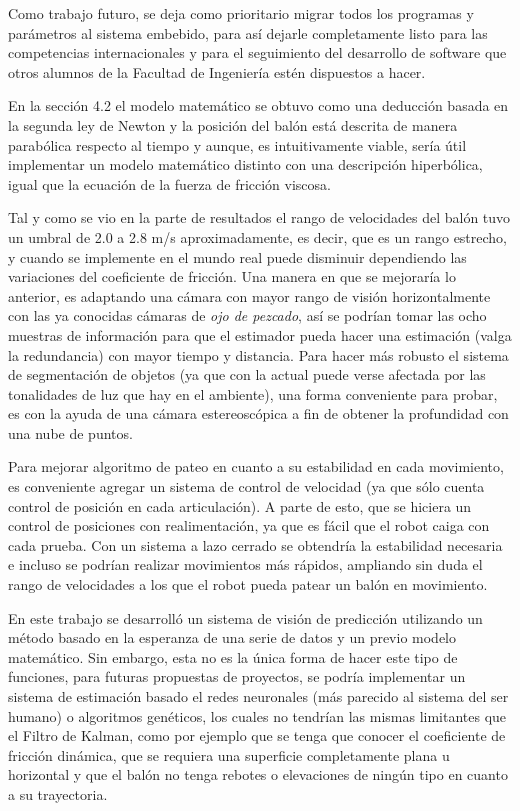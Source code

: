 	Como trabajo futuro, se deja como prioritario migrar todos los programas y parámetros al sistema embebido, para así dejarle completamente listo para las competencias internacionales y para el seguimiento del desarrollo de software que otros alumnos de la Facultad de Ingeniería estén dispuestos a hacer.

	 En la sección 4.2 el modelo matemático se obtuvo como una deducción basada en la segunda ley de Newton y la posición del balón está descrita de manera parabólica respecto al tiempo y aunque, es intuitivamente viable, sería útil implementar un modelo matemático distinto con una descripción hiperbólica, igual que la ecuación de la fuerza de fricción viscosa.
	 
	Tal y como se vio en la parte de resultados el rango de velocidades del balón tuvo un umbral de 2.0 a 2.8 m/s aproximadamente, es decir, que es un rango estrecho, y cuando se implemente en el mundo real puede disminuir dependiendo las variaciones del coeficiente de fricción. Una manera en que se mejoraría lo anterior, es adaptando una cámara con mayor rango de visión horizontalmente con las ya conocidas cámaras de \textit{ojo de pezcado}, así se podrían tomar las ocho muestras de información para que el estimador pueda hacer una estimación (valga la redundancia) con mayor tiempo y distancia. Para hacer más robusto el sistema de segmentación de objetos (ya que con la actual puede verse afectada por las tonalidades de luz que hay en el ambiente), una forma conveniente para probar, es con la ayuda de una cámara estereoscópica a fin de obtener la profundidad con una nube de puntos.

	Para mejorar algoritmo de pateo en cuanto a su estabilidad en cada movimiento, es conveniente agregar un sistema de control de velocidad (ya que sólo cuenta control de posición en cada articulación). A parte de esto, que se hiciera un control de posiciones con realimentación, ya que es fácil que el robot caiga con cada prueba. Con un sistema a lazo cerrado se obtendría la estabilidad necesaria e incluso se podrían realizar movimientos más rápidos, ampliando sin duda el rango de velocidades a los que el robot pueda patear un balón en movimiento. 
		
	En este trabajo se desarrolló un sistema de visión de predicción utilizando un método basado en la esperanza de una serie de datos y un previo modelo matemático. Sin embargo, esta no es la única forma de hacer este tipo de funciones, para futuras propuestas de proyectos, se podría implementar un sistema de estimación basado el redes neuronales (más parecido al sistema del ser humano) o algoritmos genéticos, los cuales no tendrían las mismas limitantes que el Filtro de Kalman, como por ejemplo que se tenga que conocer el coeficiente de fricción dinámica, que se requiera una superficie completamente plana u horizontal y que el balón no tenga rebotes o elevaciones de ningún tipo en cuanto a su trayectoria.
	
	